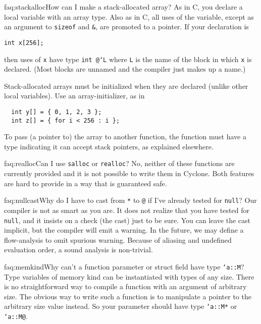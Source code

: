 \begin{faqa}{faq:stackalloc}{How can I make a stack-allocated array?}
As in C, you declare a local variable with an array type.  Also as in
C, all uses of the variable, except as an argument to \texttt{sizeof}
and \texttt{\&}, are promoted to a pointer.  If your declaration is
\begin{verbatim}
int x[256];
\end{verbatim}
then uses of \texttt{x} have type \texttt{int @`L\rb} where
\texttt{L} is the name of the block in which \texttt{x} is declared.
(Most blocks are unnamed and the compiler just makes up a name.)

Stack-allocated arrays must be initialized when they are declared
(unlike other local variables).  Use an array-initializer, as in
\begin{verbatim}
  int y[] = { 0, 1, 2, 3 };
  int z[] = { for i < 256 : i };
\end{verbatim}

To pass (a pointer to) the array to another function, the function
must have a type indicating it can accept stack pointers, as explained
elsewhere.
\end{faqa}

\begin{faqa}{faq:realloc}{Can I use \texttt{salloc} or \texttt{realloc}?}
No, neither of these functions are currently provided and it is not
possible to write them in Cyclone.  Both features are hard to provide
in a way that is guaranteed safe.
\end{faqa}

\begin{faqa}{faq:nullcast}{Why do I have to cast from \texttt{*} to \texttt{@} if I've already tested for \texttt{null}?} 
Our compiler is not as smart as you are.  It does not realize that you
have tested for \texttt{null}, and it insists on a check (the cast)
just to be sure.  You can leave the cast implicit, but the compiler
will emit a warning.  In the future, we may define a flow-analysis to
omit spurious warning.  Because of aliasing and undefined evaluation
order, a sound analysis is non-trivial.
\end{faqa}

\begin{faqa}{faq:memkind}{Why can't a function parameter or struct field have type \texttt{`a::M}?} 
Type variables of memory kind can be instantiated with types of any
size.  There is no straightforward way to compile a function with an
argument of arbitrary size.  The obvious way to write such a function
is to manipulate a pointer to the arbitrary size value instead.  So
your parameter should have type \texttt{`a::M*} or \texttt{`a::M@}.
\end{faqa}

